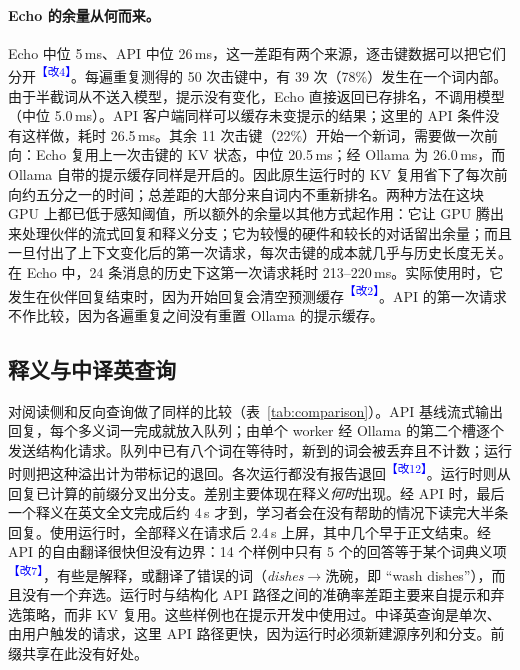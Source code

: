 \documentclass[11pt,a4paper,fontset=windows]{ctexart}
\newcommand{\audit}[1]{\textcolor{blue}{\textsuperscript{【改#1】}}}
\begin{document}
\paragraph{Echo 的余量从何而来。}Echo 中位 5\,ms、API 中位 26\,ms，这一差距有两个来源，逐击键数据可以把它们分开\audit{4}。每遍重复测得的 50 次击键中，有 39 次（78\%）发生在一个词内部。由于半截词从不送入模型，提示没有变化，Echo 直接返回已存排名，不调用模型（中位 5.0\,ms）。API 客户端同样可以缓存未变提示的结果；这里的 API 条件没有这样做，耗时 26.5\,ms。其余 11 次击键（22\%）开始一个新词，需要做一次前向：Echo 复用上一次击键的 KV 状态，中位 20.5\,ms；经 Ollama 为 26.0\,ms，而 Ollama 自带的提示缓存同样是开启的。因此原生运行时的 KV 复用省下了每次前向约五分之一的时间；总差距的大部分来自词内不重新排名。两种方法在这块 GPU 上都已低于感知阈值，所以额外的余量以其他方式起作用：它让 GPU 腾出来处理伙伴的流式回复和释义分支；它为较慢的硬件和较长的对话留出余量；而且一旦付出了上下文变化后的第一次请求，每次击键的成本就几乎与历史长度无关。在 Echo 中，24 条消息的历史下这第一次请求耗时 213--220\,ms。实际使用时，它发生在伙伴回复结束时，因为开始回复会清空预测缓存\audit{2}。API 的第一次请求不作比较，因为各遍重复之间没有重置 Ollama 的提示缓存。

\subsection{释义与中译英查询}
对阅读侧和反向查询做了同样的比较（表~\ref{tab:comparison}）。API 基线流式输出回复，每个多义词一完成就放入队列；由单个 worker 经 Ollama 的第二个槽逐个发送结构化请求。队列中已有八个词在等待时，新到的词会被丢弃且不计数；运行时则把这种溢出计为带标记的退回。各次运行都没有报告退回\audit{12}。运行时则从回复已计算的前缀分叉出分支。差别主要体现在释义\emph{何时}出现。经 API 时，最后一个释义在英文全文完成后约 4\,s 才到，学习者会在没有帮助的情况下读完大半条回复。使用运行时，全部释义在请求后 2.4\,s 上屏，其中几个早于正文结束。经 API 的自由翻译很快但没有边界：14 个样例中只有 5 个的回答等于某个词典义项\audit{7}，有些是解释，或翻译了错误的词（\emph{dishes}$\to$洗碗，即 ``wash dishes''），而且没有一个弃选。运行时与结构化 API 路径之间的准确率差距主要来自提示和弃选策略，而非 KV 复用。这些样例也在提示开发中使用过。中译英查询是单次、由用户触发的请求，这里 API 路径更快，因为运行时必须新建源序列和分支。前缀共享在此没有好处。
\end{document}
